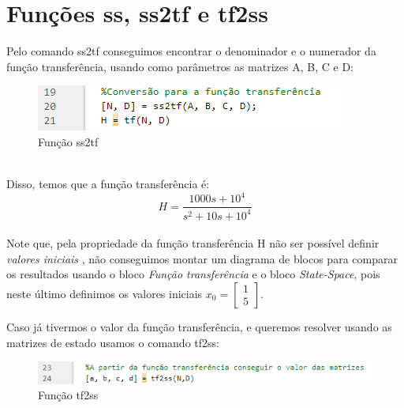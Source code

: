 \documentclass[a4paper, 12pt]{article}
\begin{document}
\section{Funções ss, ss2tf e tf2ss}
	Pelo comando ss2tf conseguimos encontrar o denominador e o numerador da função transferência, usando como parâmetros as matrizes A, B, C e D:
	\begin{figure}[h]
		\centering
		\includegraphics[scale=0.8]{imagens/a11.png}
		\caption{Função ss2tf}
	\end{figure}\\
	Disso, temos que a função transferência é:
		\begin{equation}
			H = \frac{1000s + 10^4}{s^2 + 10s + 10^4}
		\end{equation}
	\\
	
	Note que, pela propriedade da função transferência H não ser possível definir \textit{valores iniciais 	}, não conseguimos montar um diagrama de blocos para comparar os resultados usando o bloco \textit{Função transferência} e o bloco \textit{State-Space}, pois neste último definimos os valores iniciais $x_0 = \begin{bmatrix}
	1\\5	
	\end{bmatrix}
$.
	
	Caso já tivermos o valor da função transferência, e queremos resolver usando as matrizes de estado usamos o comando tf2ss:
	\begin{figure}[h]
		\centering
		\includegraphics[scale=0.8]{imagens/a12.png}
		\caption{Função tf2ss}
	\end{figure}
	
\end{document}
